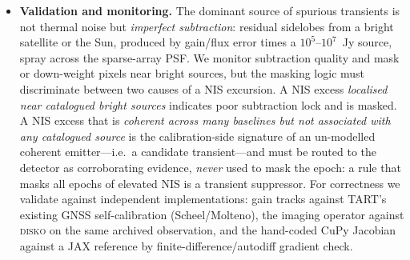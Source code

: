 \documentclass[11pt]{article}
\begin{document}
\begin{itemize}[leftmargin=*]
        (the format of the validation archive) and converts them \emph{up front} into a single
        canonical, MSv4-compliant \texttt{xarray} dataset (the \texttt{read\_tart\_hdf} utility), so
        every downstream operator consumes one well-defined layout regardless of the source format;
        the existing MSv4 reader supplies that schema as the structural template. Whatever the
        format, the reader must propagate per-frame timestamps: no downstream stage may assume a
        constant $\Delta$ (Section~\ref{sec:statespace}). A \emph{fully streamed} deployment is
        deliberately out of scope for now, but its requirements are recorded so they are not designed
        out: (i) the live ingest source is the TART per-integration API endpoint, not minute-batched
        HDF files, so the genuine end-to-end latency floor is the integration cadence ($\sim$1~s)
        plus the smoother lag $L$---\emph{not} the 60~s HDF chunking used here; (ii) the live API
        snapshot carries only visibilities and a timestamp, so array configuration, antenna
        positions, and any existing gain solutions must arrive on a side channel; and (iii) the
        ingest format and timestamp contract must be frozen with the TART operators (a Stage-4 action
        item). Until then the HDF path is sufficient to build and validate the entire pipeline.
  \item \textbf{Validation and monitoring.} The dominant source of spurious transients is not thermal
        noise but \emph{imperfect subtraction}: residual sidelobes from a bright satellite or the Sun,
        produced by gain/flux error times a $10^5$--$10^7$~Jy source, spray across the sparse-array
        PSF. We monitor subtraction quality and mask or down-weight pixels near bright sources, but
        the masking logic must discriminate between two causes of a NIS excursion. A NIS excess
        \emph{localised near catalogued bright sources} indicates poor subtraction lock and is
        masked. A NIS excess that is \emph{coherent across many baselines but not associated with
        any catalogued source} is the calibration-side signature of an un-modelled coherent
        emitter---i.e.\ a candidate transient---and must be routed to the detector as corroborating
        evidence, \emph{never} used to mask the epoch: a rule that masks all epochs of elevated NIS
        is a transient suppressor. For
        correctness we validate against independent implementations: gain tracks against TART's
        existing GNSS self-calibration (Scheel/Molteno), the imaging operator against \textsc{disko}
        on the same archived observation, and the hand-coded CuPy Jacobian against a JAX reference by
        finite-difference/autodiff gradient check.
\end{itemize}
\end{document}
